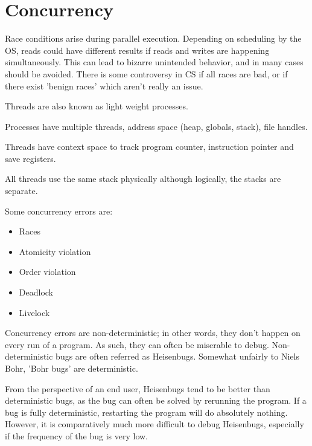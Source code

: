 \documentclass[twoside]{article}
\begin{document}
\section{Concurrency}
Race conditions arise during parallel execution. Depending on scheduling by the OS, reads could have different results if reads and writes are happening simultaneously. This can lead to bizarre unintended behavior, and in many cases should be avoided. There is some controversy in CS if all races are bad, or if there exist 'benign races' which aren't really an issue.

Threads are also known as light weight processes.

Processes have multiple threads, address space (heap, globals, stack), file handles.

Threads have context space to track program counter, instruction pointer and save registers.

All threads use the same stack physically although logically, the stacks are separate.

Some concurrency errors are:
\begin{itemize}
	\item Races
	\item Atomicity violation
	\item Order violation
	\item Deadlock
	\item Livelock
\end{itemize}

Concurrency errors are non-deterministic; in other words, they don't happen on every run of a program. As such, they can often be miserable to debug. Non-deterministic bugs are often referred as Heisenbugs. Somewhat unfairly to Niels Bohr, 'Bohr bugs' are deterministic.

From the perspective of an end user, Heisenbugs tend to be better than deterministic bugs, as the bug can often be solved by rerunning the program. If a bug is fully deterministic, restarting the program will do absolutely nothing. However, it is comparatively much more difficult to debug Heisenbugs, especially if the frequency of the bug is very low.
\end{document}
